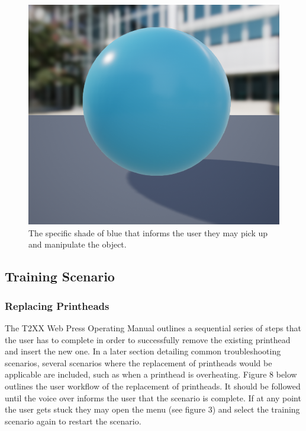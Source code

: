 \documentclass[onecolumn, draftclsnofoot,10pt, compsoc]{IEEEtran}
\begin{document}
\begin{figure}[ht!]
    \centering
    \includegraphics[scale=0.5]{touchMeBlue.png}
    \caption{The specific shade of blue that informs the user they may pick up and manipulate the object.}
    \label{fig:skyblue}
\end{figure}

\subsection{Training Scenario}

\subsubsection{Replacing Printheads}

The T2XX Web Press Operating Manual outlines a sequential series of steps that the user has to complete in order to successfully remove the existing printhead and insert the new one. In a later section detailing common troubleshooting scenarios, several scenarios where the replacement of printheads would be applicable are included, such as when a printhead is overheating. Figure 8 below outlines the user workflow of the replacement of printheads. It should be followed until the voice over informs the user that the scenario is complete. If at any point the user gets stuck they may open the menu (see figure 3) and select the training scenario again to restart the scenario.
\end{document}
